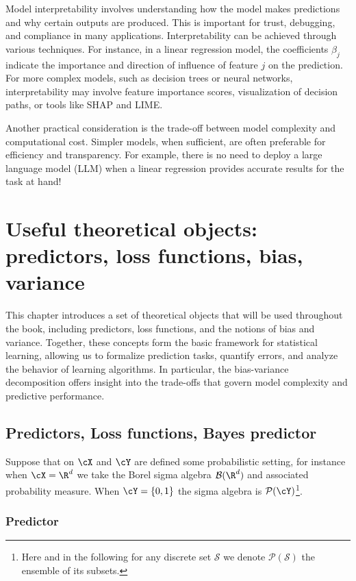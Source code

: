 Model interpretability involves understanding how the model makes predictions
and why certain outputs are produced. This is important for trust, debugging,
and compliance in many applications. Interpretability can be achieved
through various techniques. For instance, in a linear regression model, the
coefficients $\beta_j$ indicate the importance and direction of influence of feature $j$
on the prediction. For more complex models, such as decision trees or neural
networks, interpretability may involve feature importance scores, visualization
of decision paths, or tools like SHAP and LIME.

Another practical consideration is the trade-off between model complexity
and computational cost. Simpler models, when sufficient, are often preferable
for efficiency and transparency. For example, there is no need to deploy a large
language model (LLM) when a linear regression provides accurate results for
the task at hand!

\chapter[Useful theoretical objects]{Useful theoretical objects: predictors, loss functions, bias, variance}
\label{sec:ch2-intro}

This chapter introduces a set of theoretical objects that will be used throughout
the book, including predictors, loss functions, and the notions of bias and
variance. Together, these concepts form the basic framework for statistical
learning, allowing us to formalize prediction tasks, quantify errors, and analyze
the behavior of learning algorithms. In particular, the bias-variance
decomposition offers insight into the trade-offs that govern model complexity
and predictive performance.

\section{Predictors, Loss functions, Bayes predictor}
\label{sec:ch2-predictors}

Suppose that on $\cX$ and $\cY$ are defined some probabilistic setting, for instance
when $\cX = \R^d$ we take the Borel sigma algebra $\mathcal{B}(\R^d)$ and associated probability
measure. When $\cY = \{0,1\}$ the sigma algebra is $\mathcal{P}(\cY)$\footnote{Here and in the following for any discrete set $\mathcal{S}$ we denote $\mathcal{P}(\mathcal{S})$ the ensemble of its subsets.}.

\subsection{Predictor}
\label{sec:ch2-predictor}

